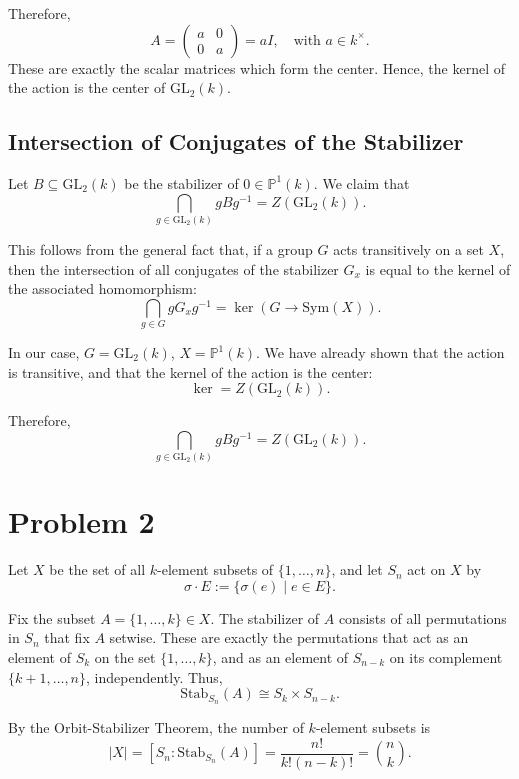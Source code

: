 \documentclass[12pt]{article}
\begin{document}
Therefore,
\[
A = \begin{pmatrix} a & 0 \\ 0 & a \end{pmatrix} = aI, \quad \text{with } a \in k^\times.
\]
These are exactly the scalar matrices which form the center. Hence, the kernel of the action is the center of \( \mathrm{GL}_2(k) \).

\subsection*{Intersection of Conjugates of the Stabilizer}

Let \( B \subseteq \mathrm{GL}_2(k) \) be the stabilizer of \( 0 \in \mathbb{P}^1(k) \). We claim that
\[
\bigcap_{g \in \mathrm{GL}_2(k)} gBg^{-1} = Z(\mathrm{GL}_2(k)).
\]

This follows from the general fact that, if a group \( G \) acts transitively on a set \( X \), then the intersection of all conjugates of the stabilizer \( G_x \) is equal to the kernel of the associated homomorphism:
\[
\bigcap_{g \in G} gG_xg^{-1} = \ker(G \to \mathrm{Sym}(X)).
\]

In our case, \( G = \mathrm{GL}_2(k) \), \( X = \mathbb{P}^1(k) \). We have already shown that the action is transitive, and that the kernel of the action is the center:
\[
\ker = Z(\mathrm{GL}_2(k)).
\]

Therefore,
\[
\bigcap_{g \in \mathrm{GL}_2(k)} gBg^{-1} = Z(\mathrm{GL}_2(k)).
\]

\section*{Problem 2}
Let \( X \) be the set of all \( k \)-element subsets of \( \{1, \dots, n\} \), and let \( S_n \) act on \( X \) by
\[
\sigma \cdot E := \{ \sigma(e) \mid e \in E \}.
\]

Fix the subset \( A = \{1, \dots, k\} \in X \). The stabilizer of \( A \) consists of all permutations in \( S_n \) that fix \( A \) setwise. These are exactly the permutations that act as an element of \( S_k \) on the set \( \{1, \dots, k\} \), and as an element of \( S_{n-k} \) on its complement \( \{k+1, \dots, n\} \), independently. Thus,
\[
\mathrm{Stab}_{S_n}(A) \cong S_k \times S_{n-k}.
\]

By the Orbit-Stabilizer Theorem, the number of \( k \)-element subsets is
\[
|X| = [S_n : \mathrm{Stab}_{S_n}(A)] = \frac{n!}{k!(n - k)!} = \binom{n}{k}.
\]
\end{document}
